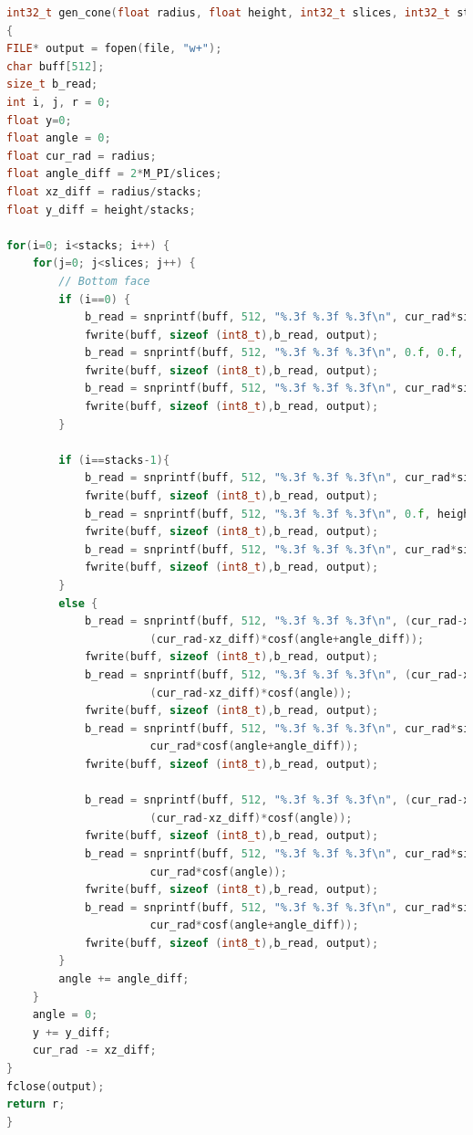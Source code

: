 \documentclass[14pt, a4 paper]{article}
\begin{document}
\begin{lstlisting}[language = c++]
int32_t gen_cone(float radius, float height, int32_t slices, int32_t stacks, char*file)
{
FILE* output = fopen(file, "w+");
char buff[512];
size_t b_read;
int i, j, r = 0;
float y=0;
float angle = 0;
float cur_rad = radius;
float angle_diff = 2*M_PI/slices;
float xz_diff = radius/stacks;
float y_diff = height/stacks;

for(i=0; i<stacks; i++) {
    for(j=0; j<slices; j++) {
        // Bottom face
        if (i==0) {
            b_read = snprintf(buff, 512, "%.3f %.3f %.3f\n", cur_rad*sinf(angle), 0.f, cur_rad*cosf(angle));
            fwrite(buff, sizeof (int8_t),b_read, output);
            b_read = snprintf(buff, 512, "%.3f %.3f %.3f\n", 0.f, 0.f, 0.f);
            fwrite(buff, sizeof (int8_t),b_read, output);
            b_read = snprintf(buff, 512, "%.3f %.3f %.3f\n", cur_rad*sinf(angle+angle_diff), 0.f, cur_rad*cosf(angle+angle_diff));
            fwrite(buff, sizeof (int8_t),b_read, output);
        }
       
        if (i==stacks-1){              
            b_read = snprintf(buff, 512, "%.3f %.3f %.3f\n", cur_rad*sinf(angle+angle_diff), y, cur_rad*cosf(angle+angle_diff));
            fwrite(buff, sizeof (int8_t),b_read, output);
            b_read = snprintf(buff, 512, "%.3f %.3f %.3f\n", 0.f, height, 0.f);
            fwrite(buff, sizeof (int8_t),b_read, output);
            b_read = snprintf(buff, 512, "%.3f %.3f %.3f\n", cur_rad*sinf(angle), y, cur_rad*cosf(angle));
            fwrite(buff, sizeof (int8_t),b_read, output);
        }
        else {
            b_read = snprintf(buff, 512, "%.3f %.3f %.3f\n", (cur_rad-xz_diff)*sinf(angle+angle_diff), y+y_diff,
                      (cur_rad-xz_diff)*cosf(angle+angle_diff));
            fwrite(buff, sizeof (int8_t),b_read, output);
            b_read = snprintf(buff, 512, "%.3f %.3f %.3f\n", (cur_rad-xz_diff)*sinf(angle), y+y_diff,
                      (cur_rad-xz_diff)*cosf(angle));
            fwrite(buff, sizeof (int8_t),b_read, output);
            b_read = snprintf(buff, 512, "%.3f %.3f %.3f\n", cur_rad*sinf(angle+angle_diff), y,
                      cur_rad*cosf(angle+angle_diff));
            fwrite(buff, sizeof (int8_t),b_read, output);

            b_read = snprintf(buff, 512, "%.3f %.3f %.3f\n", (cur_rad-xz_diff)*sinf(angle), y+y_diff,
                      (cur_rad-xz_diff)*cosf(angle));
            fwrite(buff, sizeof (int8_t),b_read, output);
            b_read = snprintf(buff, 512, "%.3f %.3f %.3f\n", cur_rad*sinf(angle), y,
                      cur_rad*cosf(angle));
            fwrite(buff, sizeof (int8_t),b_read, output);
            b_read = snprintf(buff, 512, "%.3f %.3f %.3f\n", cur_rad*sinf(angle+angle_diff), y,
                      cur_rad*cosf(angle+angle_diff));
            fwrite(buff, sizeof (int8_t),b_read, output);
        }
        angle += angle_diff;
    }
    angle = 0;
    y += y_diff;
    cur_rad -= xz_diff;
}
fclose(output);
return r;
}
\end{lstlisting}
\end{document}
